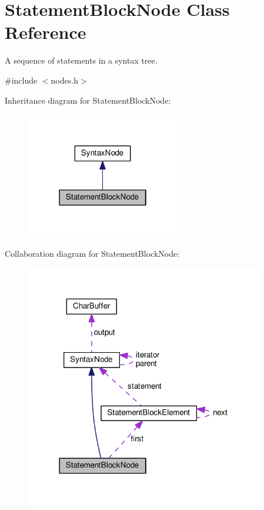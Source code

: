 \hypertarget{classStatementBlockNode}{}\section{Statement\+Block\+Node Class Reference}
\label{classStatementBlockNode}


A sequence of statements in a syntax tree.  




{\ttfamily \#include $<$nodes.\+h$>$}



Inheritance diagram for Statement\+Block\+Node\+:\nopagebreak
\begin{figure}[H]
\begin{center}
\leavevmode
\includegraphics[width=190pt]{classStatementBlockNode__inherit__graph}
\end{center}
\end{figure}


Collaboration diagram for Statement\+Block\+Node\+:\nopagebreak
\begin{figure}[H]
\begin{center}
\leavevmode
\includegraphics[width=295pt]{classStatementBlockNode__coll__graph}
\end{center}
\end{figure}

